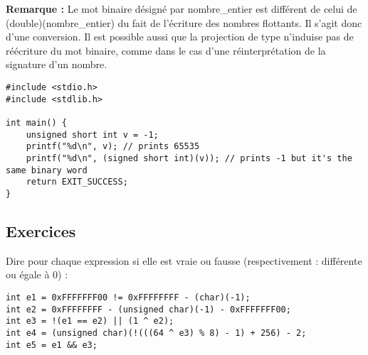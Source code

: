 \documentclass[../../../main.tex]{subfiles}
\begin{document}
\textbf{Remarque :} Le mot binaire désigné par \textsf{nombre\_entier} est différent de celui de \textsf{(double)(nombre\_entier)} du fait de l'écriture des nombres flottants. Il s'agit donc d'une conversion. Il est possible aussi que la projection de type n'induise pas de réécriture du mot binaire, comme dans le cas d'une réinterprétation de la signature d'un nombre. 
\begin{verbatim}
#include <stdio.h>
#include <stdlib.h>

int main() {
	unsigned short int v = -1;
	printf("%d\n", v); // prints 65535
	printf("%d\n", (signed short int)(v)); // prints -1 but it's the same binary word
	return EXIT_SUCCESS;
}
\end{verbatim}
\subsection{Exercices}
\newline
Dire pour chaque expression si elle est vraie ou fausse (respectivement : différente ou égale à 0) :
\begin{verbatim}
int e1 = 0xFFFFFFF00 != 0xFFFFFFFF - (char)(-1);
int e2 = 0xFFFFFFFF - (unsigned char)(-1) - 0xFFFFFFF00;
int e3 = !(e1 == e2) || (1 ^ e2);
int e4 = (unsigned char)(!(((64 ^ e3) % 8) - 1) + 256) - 2;
int e5 = e1 && e3;
\end{verbatim}
\end{document}
